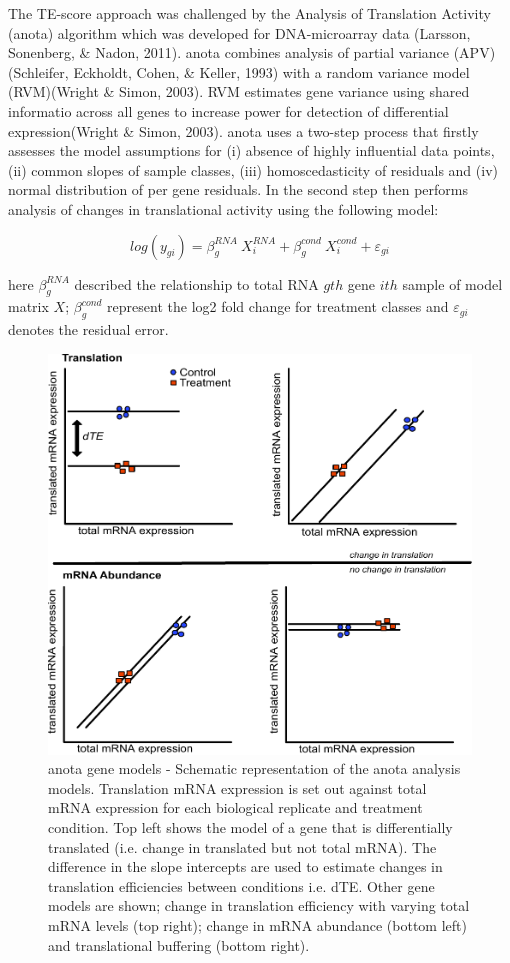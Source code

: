 \documentclass[12pt,openany]{book}
\begin{document}
The TE-score approach was challenged by the Analysis of Translation
Activity (anota) algorithm which was developed for DNA-microarray data
(Larsson, Sonenberg, \& Nadon, 2011). anota combines analysis of partial
variance (APV)(Schleifer, Eckholdt, Cohen, \& Keller, 1993) with a
random variance model (RVM)(Wright \& Simon, 2003). RVM estimates gene
variance using shared informatio across all genes to increase power for
detection of differential expression(Wright \& Simon, 2003). anota uses
a two-step process that firstly assesses the model assumptions for (i)
absence of highly influential data points, (ii) common slopes of sample
classes, (iii) homoscedasticity of residuals and (iv) normal
distribution of per gene residuals. In the second step then performs
analysis of changes in translational activity using the following model:

\[log(y_{gi}) = \beta_g^{RNA}\ X_i^{RNA}+ \beta_g^{cond}\ X_i^{cond} + \varepsilon_{gi}\]

here \(\beta_g^{RNA}\) described the relationship to total RNA \(gth\)
gene \(ith\) sample of model matrix \(X\); \(\beta_g^{cond}\) represent
the log2 fold change for treatment classes and \(\varepsilon_{gi}\)
denotes the residual error.

\begin{figure}
  \includegraphics{./figures/geneModes_anota_Larsson.pdf}
  \caption{anota gene models - Schematic representation of the anota analysis models. Translation mRNA expression is set out against total mRNA expression for each biological replicate and treatment condition. Top left shows the model of a gene that is differentially translated (i.e. change in translated but not total mRNA). The difference in the slope intercepts are used to estimate changes in translation efficiencies between conditions i.e. dTE. Other gene models are shown; change in translation efficiency with varying total mRNA levels (top right); change in mRNA abundance (bottom left) and translational buffering (bottom right).
  \label{fig:anota}}
\end{figure}
\end{document}
